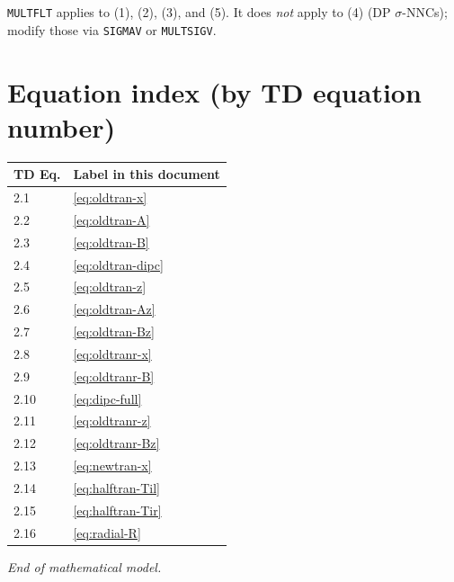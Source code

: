 \documentclass[11pt,a4paper]{article}
\newcommand{\kw}[1]{\texttt{#1}}
\begin{document}
\kw{MULTFLT} applies to (1), (2), (3), and (5). It does \emph{not} apply to (4) (DP $\sigma$-NNCs);
modify those via \kw{SIGMAV} or \kw{MULTSIGV}.

\appendix
\section{Equation index (by TD equation number)}
\begin{center}\small
\begin{tabular}{ll}
\toprule
TD Eq. & Label in this document \\
\midrule
2.1  & \eqref{eq:oldtran-x}  \\
2.2  & \eqref{eq:oldtran-A}  \\
2.3  & \eqref{eq:oldtran-B}  \\
2.4  & \eqref{eq:oldtran-dipc} \\
2.5  & \eqref{eq:oldtran-z}  \\
2.6  & \eqref{eq:oldtran-Az} \\
2.7  & \eqref{eq:oldtran-Bz} \\
2.8  & \eqref{eq:oldtranr-x} \\
2.9  & \eqref{eq:oldtranr-B} \\
2.10 & \eqref{eq:dipc-full}  \\
2.11 & \eqref{eq:oldtranr-z} \\
2.12 & \eqref{eq:oldtranr-Bz}\\
2.13 & \eqref{eq:newtran-x}  \\
2.14 & \eqref{eq:halftran-Til}\\
2.15 & \eqref{eq:halftran-Tir}\\
2.16 & \eqref{eq:radial-R}   \\
\bottomrule
\end{tabular}
\end{center}

\bigskip\noindent\emph{End of mathematical model.}
\end{document}
